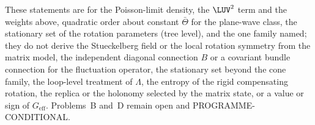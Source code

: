 These statements are for the Poisson-limit density, the \(\LUV^2\) term and the weights above, quadratic order about constant \(\bar\Theta\) for the plane-wave class, the stationary set of the rotation parameters (tree level), and the one family named; they do not derive the Stueckelberg field or the local rotation symmetry from the matrix model, the independent diagonal connection \(B\) or a covariant bundle connection for the fluctuation operator, the stationary set beyond the cone family, the loop-level treatment of \(\Lambda\), the entropy of the rigid compensating rotation, the replica or the holonomy selected by the matrix state, or a value or sign of \(G_{\mathrm{eff}}\). Problems~B and~D remain open and PROGRAMME-CONDITIONAL.
